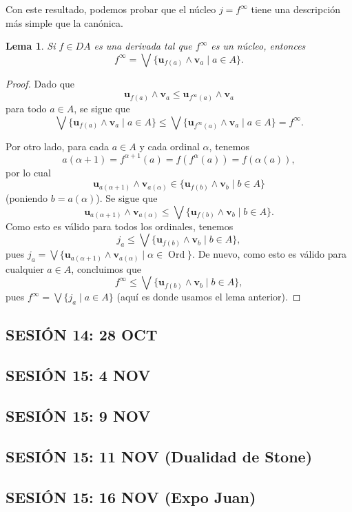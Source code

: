 \documentclass[12pt,letterpaper,titlepage]{article}
\newtheorem*{lemma}{Lema}
\theoremstyle{definition}
\newcommand\Sup{\bigvee}
\renewcommand\inf{\wedge}
\newcommand\unuc[1]{\mathbf u_{#1}}
\newcommand\vnuc[1]{\mathbf v_{#1}}
\newcommand\<{\langle}
\renewcommand\>{\rangle}
\DeclareMathOperator{\Ord}{Ord}
\begin{document}
Con este resultado, podemos probar que el núcleo $j=f^\infty$
tiene una descripción más simple que la canónica.

\begin{lemma}
  Si $f\in DA$ es una derivada tal que $f^\infty$ es un núcleo,
  entonces
  \[
    f^\infty = \Sup\{\unuc{f(a)}\inf\vnuc a \mid a\in A\}
  .\]
\end{lemma}
\begin{proof}
  Dado que
  \[
    \unuc{f(a)}\inf\vnuc a\leq \unuc{f^\infty(a)}\inf\vnuc a
  \]
  para todo $a\in A$, se sigue que
  \[
    \Sup\{\unuc{f(a)}\inf\vnuc a \mid a\in A\}
    \leq
    \Sup\{\unuc{f^\infty(a)}\inf\vnuc a \mid a\in A\}
    = f^\infty
  .\]

  Por otro lado, para cada $a\in A$ y cada ordinal $\alpha$, tenemos
  \[
    a(\alpha+1)=f^{\alpha+1}(a)=f(f^\alpha(a))=f(\alpha(a))
  ,\]
  por lo cual
  \[
     \unuc{a(\alpha+1)}\inf\vnuc{a(\alpha)}
     \in
     \{\unuc{f(b)}\inf\vnuc b \mid b\in A\}
  \]
  (poniendo $b=a(\alpha)$).
  Se sigue que
  \[
     \unuc{a(\alpha+1)}\inf\vnuc{a(\alpha)}
     \leq
     \Sup\{\unuc{f(b)}\inf\vnuc b \mid b\in A\}
  .\]
  Como esto es válido para todos los ordinales, tenemos
  \[
     j_a\leq \Sup\{\unuc{f(b)}\inf\vnuc b \mid b\in A\}
  ,\]
  pues $j_a = \Sup\{\unuc{a(\alpha+1)}\inf\vnuc{a(\alpha)}
   \mid\alpha\in\Ord\}$.
  De nuevo, como esto es válido para cualquier $a\in A$, concluimos
  que
  \[
     f^\infty\leq \Sup\{\unuc{f(b)}\inf\vnuc b \mid b\in A\}
  ,\]
  pues $f^\infty = \Sup\{j_a\mid a\in A\}$ (aquí es donde usamos
  el lema anterior).
\end{proof}


\subsection*{SESIÓN 14: 28 OCT}
\subsection*{SESIÓN 15: 4 NOV}
\subsection*{SESIÓN 15: 9 NOV}
\subsection*{SESIÓN 15: 11 NOV (Dualidad de Stone)}
\subsection*{SESIÓN 15: 16 NOV (Expo Juan)}
\end{document}
